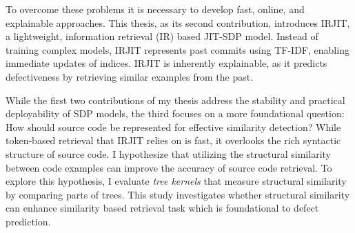 \documentclass[\main/thesis.tex]{subfiles}
\begin{document}

To overcome these problems it is necessary to develop fast, online, and explainable approaches. 
This thesis, as its second contribution, introduces IRJIT, a lightweight, information retrieval (IR) based JIT-SDP model. Instead of training complex models, IRJIT represents past commits using TF-IDF, enabling immediate updates of indices. IRJIT is inherently explainable, as it predicts defectiveness by retrieving similar examples from the past. %

While the first two contributions of my thesis address the stability and practical deployability of SDP models, the third focuses on a more foundational question: How should source code be represented for effective similarity detection? While token-based retrieval that IRJIT relies on is fast, it overlooks the rich syntactic structure of source code. I hypothesize that utilizing the structural similarity between code examples can improve the accuracy of source code retrieval. To explore this hypothesis, I evaluate \textit{tree kernels} that measure structural similarity by comparing parts of trees. This study investigates whether structural similarity can enhance similarity based retrieval task which is foundational to defect prediction.


\end{document}
